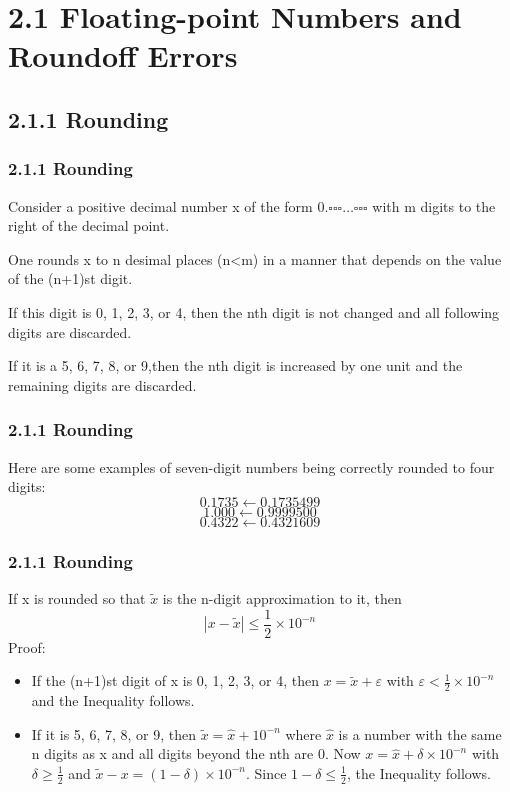 \documentclass[notheorems,mathserif,table,compress]{beamer}  %
\begin{document}
\section{2.1 Floating-point Numbers and Roundoff Errors}

\subsection{2.1.1 Rounding}


\begin{frame}
  \frametitle{2.1.1 Rounding}
  Consider a positive decimal number x of the form $0.\square \square \square \ldots \square \square \square$ with m digits to the right of the decimal point.

  One rounds x to n desimal places (n<m) in a manner that depends on the value of the (n+1)st digit.

  If this digit is 0, 1, 2, 3, or 4, then the nth digit is not changed
and all following digits are discarded.

  If it is a 5, 6, 7, 8, or 9,then the nth digit is increased by one unit and the remaining digits are discarded.
\end{frame}


\begin{frame}
  \frametitle{2.1.1 Rounding}
  Here are some examples of seven-digit numbers being correctly rounded to four digits:
  \begin{displaymath}
  0.1735 \longleftarrow 0.1735499
  \end{displaymath}
  \begin{displaymath}
  1.000 \longleftarrow 0.9999500
  \end{displaymath}
  \begin{displaymath}
  0.4322 \longleftarrow 0.4321609
  \end{displaymath}
\end{frame}


\begin{frame}
  \frametitle{2.1.1 Rounding}
  If x is rounded so that $\widetilde{x}$ is the n-digit approximation to it, then 
  \begin{displaymath}
  |x- \widetilde{x}| \leq \frac{1}{2} \times 10^{-n}
  \end{displaymath}
  Proof:
  \begin{itemize}
     \item If the (n+1)st digit of x is 0, 1, 2, 3, or 4, then $x= \widetilde{x} + \varepsilon$ with $\varepsilon<\frac{1}{2}\times 10^{-n}$ and the Inequality follows.
     \item If it is 5, 6, 7, 8, or 9, then $\widetilde{x}=\widehat{x}+10^{-n}$ where $\widehat{x}$ is a number with the same n digits as x and all digits beyond the nth are 0. Now $x=\widehat{x}+\delta \times 10^{-n}$ with $\delta \geq \frac{1}{2}$ and $\widetilde{x}-x=(1-\delta) \times 10^{-n}$. Since $1- \delta \le \frac{1}{2}$, the Inequality follows.
  \end{itemize}
\end{frame}
\end{document}
